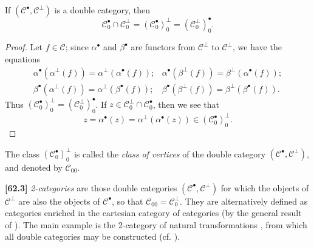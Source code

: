 \documentclass[a4paper,fleqn]{article}
\theoremstyle{plain}
\newenvironment{proposition}[1]
  {\renewcommand\theinnerproposition{#1}\innerproposition}
  {\endinnerproposition}
\theoremstyle{definition}
\newenvironment{definition}[1]
  {\renewcommand\theinnerdefinition{#1}\innerdefinition}
  {\endinnerdefinition}
\newenvironment{longcomm}[1]
  {\noindent\textbf{[#1]}\rmfamily}
  {}
\newcommand{\oldpage}[1]{{\marginpar{\footnotesize$\bigg\vert$\,\,\,\,\textit{p.~#1}}}}
\newcommand{\CC}{\mathcal{C}}
\begin{document}
\begin{proposition}{10}
\label{proposition:ii-10}
  If $(\CC^\bullet,\CC^\perp)$ is a double category, then
  \[
    \CC_0^\bullet\cap\CC_0^\perp
    = (\CC_0^\bullet)_0^\perp
    = (\CC_0^\perp)_0^\bullet.
  \]
\end{proposition}

\begin{proof}
  Let $f\in\CC$;
  since $\alpha^\bullet$ and $\beta^\bullet$ are functors from $\CC^\perp$ to $\CC^\perp$, we have the equations
  \[
    \begin{array}{cc}
      \alpha^\bullet(\alpha^\perp(f))
      = \alpha^\perp(\alpha^\bullet(f));
      & \alpha^\bullet(\beta^\perp(f))
      = \beta^\perp(\alpha^\bullet(f));
    \\\beta^\bullet(\alpha^\perp(f))
      = \alpha^\perp(\beta^\bullet(f));
      & \beta^\bullet(\beta^\perp(f))
      = \beta^\perp(\beta^\bullet(f)).
    \end{array}
  \]
  Thus $(\CC_0^\bullet)_0^\perp=(\CC_0^\perp)_0^\bullet$.
  If $z\in\CC_0^\perp\cap\CC_0^\bullet$, then we see that
  \[
    z
    = \alpha^\bullet(z)
    = \alpha^\perp(\alpha^\bullet(z))
    \in (\CC_0^\bullet)_0^\perp.
  \]
\end{proof}

\begin{definition}{11}
\label{definition:ii-11}
  The class $(\CC_0^\bullet)_0^\perp$ is called the \emph{class of vertices} of the double category $(\CC^\bullet,\CC^\perp)$, and denoted by $\CC_{00}$.
\end{definition}

\begin{longcomm}{62.3}
  \emph{2-categories} are those double categories $(\CC^\bullet,\CC^\perp)$ for which the objects of $\CC^\perp$ are also the objects of $\CC^\bullet$, so that $\CC_{00}=\CC_0^\perp$.
  They are alternatively defined as categories enriched in the cartesian category of categories (by the general result of \cite[Appendix]{coll120}).
  The main example is the 2-category of natural transformations \cite{coll52}, from which all double categories may be constructed (cf. \cite[Comment~105.1]{coll64}).
\end{longcomm}

\oldpage{391}
\end{document}
